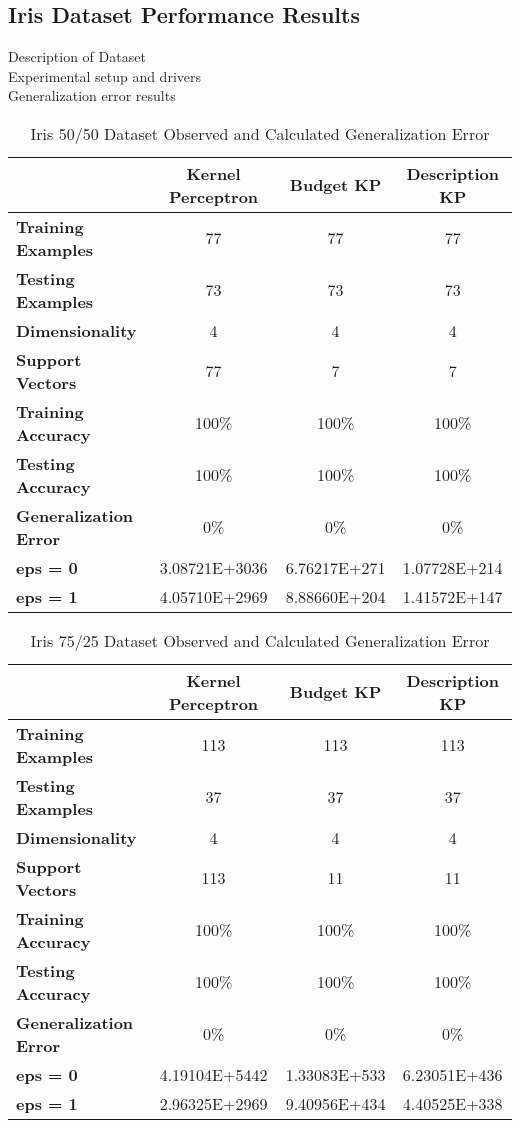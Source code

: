 \subsection{Iris Dataset Performance Results}\label{IrisResults}
Description of Dataset
\\Experimental setup and drivers
\\Generalization error results

\begin{table}[h!]
 \begin{center}
  \caption{Iris 50/50 Dataset Observed and Calculated Generalization Error}
  \label{tab:iris50gencalc}
  \begin{tabular}{l|c|c|c}
  \textbf{ } & \textbf{Kernel Perceptron} & \textbf{Budget KP} & \textbf{Description KP}\\
  \hline
  \textbf{Training Examples} & 77 & 77 & 77\\
  \textbf{Testing Examples} & 73 & 73 & 73\\
  \textbf{Dimensionality} & 4 & 4 & 4\\
  \textbf{Support Vectors} & 77 & 7 & 7\\
  \hline
  \textbf{Training Accuracy} & 100\% & 100\% & 100\%\\
  \textbf{Testing Accuracy} & 100\% & 100\% & 100\%\\
  \textbf{Generalization Error} & 0\% & 0\% & 0\%\\
  \hline
  \textbf{eps = 0} & 3.08721E+3036 & 6.76217E+271 & 1.07728E+214\\
  \textbf{eps = 1} & 4.05710E+2969 & 8.88660E+204 & 1.41572E+147\\
  \end{tabular}
 \end{center}
\end{table}

\begin{table}[h!]
 \begin{center}
  \caption{Iris 75/25 Dataset Observed and Calculated Generalization Error}
  \label{tab:iris75gencalc}
  \begin{tabular}{l|c|c|c}
  \textbf{ } & \textbf{Kernel Perceptron} & \textbf{Budget KP} & \textbf{Description KP}\\
  \hline
  \textbf{Training Examples} & 113 & 113 & 113\\
  \textbf{Testing Examples} & 37 & 37 & 37\\
  \textbf{Dimensionality} & 4 & 4 & 4\\
  \textbf{Support Vectors} & 113 & 11 & 11\\
  \hline
  \textbf{Training Accuracy} & 100\% & 100\% & 100\%\\
  \textbf{Testing Accuracy} & 100\% & 100\% & 100\%\\
  \textbf{Generalization Error} & 0\% & 0\% & 0\%\\
  \hline
  \textbf{eps = 0} & 4.19104E+5442 & 1.33083E+533 & 6.23051E+436\\
  \textbf{eps = 1} & 2.96325E+2969 & 9.40956E+434 & 4.40525E+338\\
  \end{tabular}
 \end{center}
\end{table}

